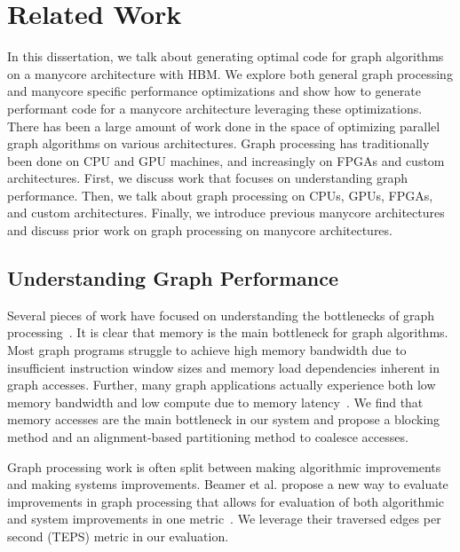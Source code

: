 \chapter{Related Work}\label{gen:sec:relatedwork}


In this dissertation, we talk about generating optimal code for graph algorithms on a manycore architecture with HBM. 
We explore both general graph processing and manycore specific performance optimizations and show how to generate performant code for a manycore architecture leveraging these optimizations. 
There has been a large amount of work done in the space of optimizing parallel graph algorithms on various architectures.
Graph processing has traditionally been done on CPU and GPU machines, and increasingly on FPGAs and custom architectures. 
First, we discuss work that focuses on understanding graph performance.
Then, we talk about graph processing on CPUs, GPUs, FPGAs, and custom architectures.
Finally, we introduce previous manycore architectures and discuss prior work on graph processing on manycore architectures.

\section{Understanding Graph Performance} Several pieces of work have focused on understanding the bottlenecks of graph processing~\citep{beamer2015locality, basak2019analysis}. It is clear that memory is the main bottleneck for graph algorithms. Most graph programs struggle to achieve high memory bandwidth due to insufficient instruction window sizes and memory load dependencies inherent in graph accesses. Further, many graph applications actually experience both low memory bandwidth and low compute due to memory latency~\cite{beamer2015locality}.
We find that memory accesses are the main bottleneck in our system and propose a blocking method and an alignment-based partitioning method to coalesce accesses.

Graph processing work is often split between making algorithmic improvements and making systems improvements. 
Beamer et al. propose a new way to evaluate improvements in graph processing that allows for evaluation of both algorithmic and system improvements in one metric~\citep{beamer2015gail}.
We leverage their traversed edges per second (TEPS) metric in our evaluation.


